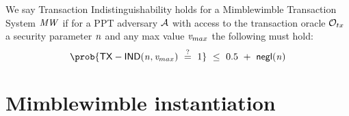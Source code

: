 \begin{center}
\end{center}

\begin{definition}
    We say Transaction Indistinguishability holds for a Mimblewimble Transaction System $\mathit{MW}$ if for a PPT adversary $\mathcal{A}$ with access to the transaction oracle $\mathcal{O}_{tx}$ a
    security parameter $\mathit{n}$ and any max value $\mathit{v}_{max}$ the following must hold:
    \[ \prob{\procTxInd{\varN}{\varValueMax} \opEq 1} \opSmEq 0.5 \opAddScalar \funNegl{\varN} \]
\end{definition}


\section{Mimblewimble instantiation}\label{sec:atomic-inst}

